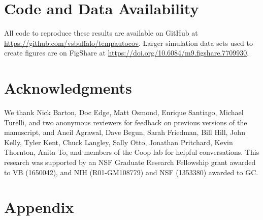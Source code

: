 \documentclass[11pt]{article}
\begin{document}
\section{Code and Data Availability}

All code to reproduce these results are available on GitHub at
\url{https://github.com/vsbuffalo/tempautocov}. Larger simulation data sets
used to create figures are on FigShare at
\url{https://doi.org/10.6084/m9.figshare.7709930}. 

\section{Acknowledgments}

We thank Nick Barton, Doc Edge, Matt Osmond, Enrique Santiago, Michael Turelli,
and two anonymous reviewers for feedback on previous versions of the
manuscript, and Aneil Agrawal, Dave Begun, Sarah Friedman, Bill Hill, John
Kelly, Tyler Kent, Chuck Langley, Sally Otto, Jonathan Pritchard, Kevin
Thornton, Anita To, and members of the Coop lab for helpful conversations.
This research was supported by an NSF Graduate Research Fellowship grant
awarded to VB (1650042), and NIH (R01-GM108779) and NSF (1353380) awarded to
GC.

\newrefcontext[sorting=nyt,maxcitenames=5]
\printbibliography

\newpage


\appendix

\section{Appendix} 
\setcounter{figure}{0}    
\end{document}
